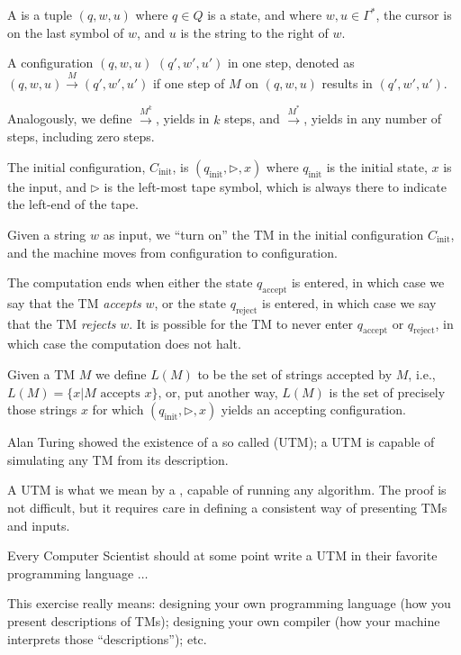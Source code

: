 \begin{frame}
A  is a tuple $(q,w,u)$ where
$q\in Q$ is a state, and where $w,u\in\Gamma^*$, the cursor is on the
last symbol of $w$, and $u$ is the string to the right of $w$.  

A configuration $(q,w,u)$  
$(q',w',u')$ in one step, denoted as
$(q,w,u)\stackrel{M}{\rightarrow}(q',w',u')$ if one step of $M$ on
$(q,w,u)$ results in $(q',w',u')$.  

Analogously, we
define $\stackrel{M^k}{\rightarrow}$, yields in $k$ steps, and
$\stackrel{M^*}{\rightarrow}$, yields in any number of steps,
including zero steps.  

The initial configuration, $C_{\text{init}}$,
is $(q_{\text{init}},\triangleright,x)$ where $q_{\text{init}}$ is the
initial state, $x$ is the input, and $\triangleright$ is the left-most
tape symbol, which is always there to indicate the left-end of the
tape.
\end{frame}

\begin{frame}
Given a string $w$ as input, we ``turn on'' the TM in the initial
configuration $C_{\text{init}}$, and the machine moves from
configuration to configuration.  

The computation ends when either the
state $q_{\text{accept}}$ is entered, in which case we say that the TM
{\em accepts} $w$, or the state $q_{\text{reject}}$ is entered, in
which case we say that the TM {\em rejects} $w$.  It is possible for
the TM to never enter $q_{\text{accept}}$ or $q_{\text{reject}}$, in
which case the computation does not halt.

Given a TM $M$ we define $L(M)$ to be the set of strings accepted by
$M$, i.e., $L(M)=\{x|\text{$M$ accepts $x$}\}$, or, put another way,
$L(M)$ is the set of precisely those strings $x$ for which
$(q_{\text{init}},\triangleright,x)$ yields an accepting
configuration.
\end{frame}

\begin{frame}
Alan Turing showed the existence of a so called  (UTM); a UTM
is capable of simulating any TM from its description.

A UTM is what we mean by a , capable of running
any algorithm.  The proof is not
difficult, but it requires care in defining a consistent way of
presenting TMs and inputs.

Every Computer Scientist should at some point write a UTM in their
favorite programming language $\ldots$

This exercise really means: designing your own programming language
(how you present descriptions of TMs); designing your own compiler
(how your machine interprets those ``descriptions''); etc.
\end{frame}

